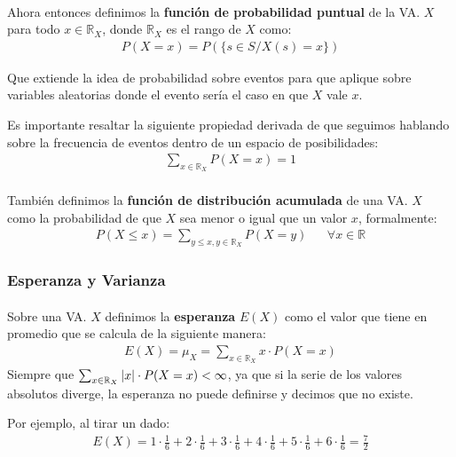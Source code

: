 \documentclass[../main.tex]{subfiles}
\begin{document}
\paragraph{} Ahora entonces definimos la \textbf{función de probabilidad puntual} de la VA. \(X\) para todo \(x \in \mathbb{R}_{X}\), donde \(\mathbb{R}_{X}\) es el rango de \(X\) como:
\begin{gather*}
  P(X = x) = P(\{s \in S / X(s) = x\})
\end{gather*}

Que extiende la idea de probabilidad sobre eventos para que aplique sobre variables aleatorias donde el evento sería el caso en que \(X\) vale \(x\).

Es importante resaltar la siguiente propiedad derivada de que seguimos hablando sobre la frecuencia de eventos dentro de un espacio de posibilidades:
\begin{align*}
  \sum_{x \in \mathbb{R}_{X}}P(X = x) = 1
\end{align*}

\paragraph{} También definimos la \textbf{función de distribución acumulada} de una VA. \(X\) como la probabilidad de que \(X\) sea menor o igual que un valor \(x\), formalmente:
\begin{align*}
  P(X \leq x) = \sum_{y \leq x, y \in \mathbb{R}_{X}}P(X = y) && \forall x \in \mathbb{R}
\end{align*}

\subsubsection{Esperanza y Varianza}

\paragraph{} Sobre una VA. \(X\) definimos la \textbf{esperanza} \(E(X)\) como el valor que tiene en promedio que se calcula de la siguiente manera:
\begin{gather*}
  E(X) = \mu_{X} = \sum_{x \in \mathbb{R}_{X}}x \cdot P(X = x)
\end{gather*}
Siempre que \(\sum_{x \in \mathbb{R}_{X}}|x| \cdot P(X = x) < \infty\), ya que si la serie de los valores absolutos diverge, la esperanza no puede definirse y decimos que no existe.

Por ejemplo, al tirar un dado:
\begin{gather*}
  E(X) = 1 \cdot \frac{1}{6} + 2 \cdot \frac{1}{6} + 3 \cdot \frac{1}{6} + 4 \cdot \frac{1}{6} + 5 \cdot \frac{1}{6} + 6 \cdot \frac{1}{6} = \frac{7}{2}
\end{gather*}
\end{document}
